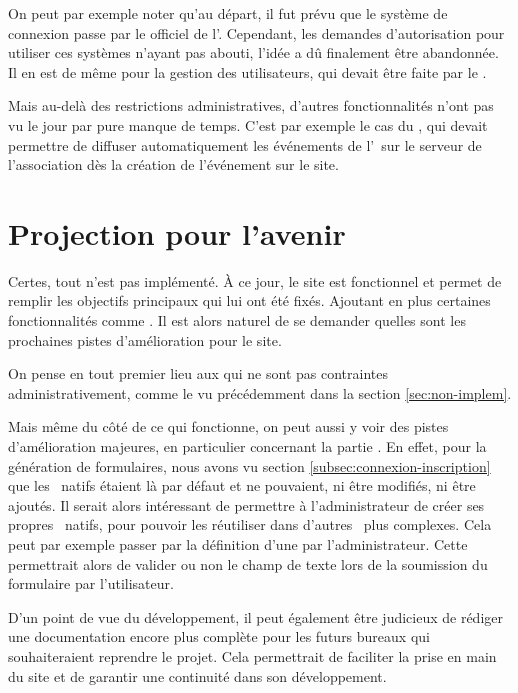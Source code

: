 On peut par exemple noter qu'au départ, il fut prévu que le système de connexion passe par le  officiel de l'\univ. Cependant, les demandes d'autorisation pour utiliser ces systèmes n'ayant pas abouti, l'idée a dû finalement être abandonnée. Il en est de même pour la gestion des utilisateurs, qui devait être faite par le .

Mais au-delà des restrictions administratives, d'autres fonctionnalités n'ont pas vu le jour par pure manque de temps. C'est par exemple le cas du , qui devait permettre de diffuser automatiquement les événements de l'\ofni\ sur le serveur  de l'association dès la création de l'événement sur le site.

\section{Projection pour l'avenir}
\label{sec:avenir}

Certes, tout n'est pas implémenté. À ce jour, le site est fonctionnel et permet de remplir les objectifs principaux qui lui ont été fixés. Ajoutant en plus certaines fonctionnalités comme \game. Il est alors naturel de se demander quelles sont les prochaines pistes d'amélioration pour le site.
\bigskip

On pense en tout premier lieu aux  qui ne sont pas contraintes administrativement, comme le  vu précédemment dans la section \ref{sec:non-implem}.

Mais même du côté de ce qui fonctionne, on peut aussi y voir des pistes d'amélioration majeures, en particulier concernant la partie . En effet, pour la génération de formulaires, nous avons vu section \ref{subsec:connexion-inscription} que les \formwidget\ natifs étaient là par défaut et ne pouvaient, ni être modifiés, ni être ajoutés. Il serait alors intéressant de permettre à l'administrateur de créer ses propres \formwidget\ natifs, pour pouvoir les réutiliser dans d'autres \formwidget\ plus complexes. Cela peut par exemple passer par la définition d'une  par l'administrateur. Cette  permettrait alors de valider ou non le champ de texte lors de la soumission du formulaire par l'utilisateur.
\bigskip

D'un point de vue du développement, il peut également être judicieux de rédiger une documentation encore plus complète pour les futurs bureaux qui souhaiteraient reprendre le projet. Cela permettrait de faciliter la prise en main du site et de garantir une continuité dans son développement.
